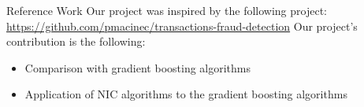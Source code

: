 \documentclass[aspectratio=169,xcolor=dvipsnames]{beamer}
\begin{document}


\begin{frame}{Reference Work}
	Our project was inspired by the following project:
	\url{https://github.com/pmacinec/transactions-fraud-detection}
	Our project's contribution is the following:
	\begin{itemize}
		\item Comparison with gradient boosting algorithms
		\item Application of NIC algorithms to the gradient boosting algorithms
	\end{itemize}
\end{frame}

\end{document}
